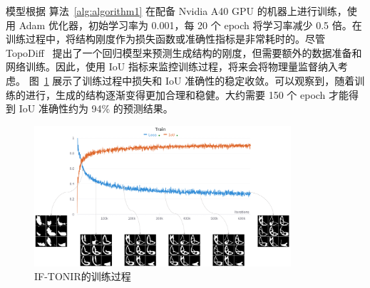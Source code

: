 模型根据 算法~\ref{alg:algorithm1} 在配备 Nvidia A40 GPU 的机器上进行训练，使用 Adam 优化器，初始学习率为 0.001，每 20 个 epoch 将学习率减少 0.5 倍。在训练过程中，将结构刚度作为损失函数或准确性指标是非常耗时的。尽管 TopoDiff~\cite{maze2022} 提出了一个回归模型来预测生成结构的刚度，但需要额外的数据准备和网络训练。因此，使用 IoU 指标来监控训练过程，将来会将物理量监督纳入考虑。 图~\ref{fig:training} 展示了训练过程中损失和 IoU 准确性的稳定收敛。可以观察到，随着训练的进行，生成的结构逐渐变得更加合理和稳健。大约需要 150 个 epoch 才能得到 IoU 准确性约为 94\% 的预测结果。
\begin{figure}[htbp]
    \centering
    \includegraphics[width=0.85\textwidth]{./figures/TONIR/fig-convergence.png}
    \caption{IF-TONIR的训练过程}
    \label{fig:training}
\end{figure}

